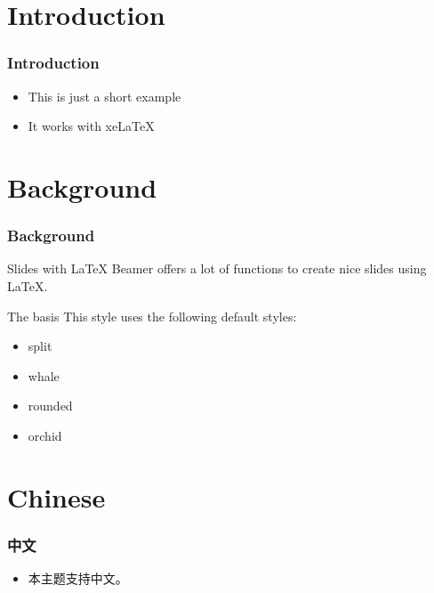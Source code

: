 \frame[plain]{\titlepage}

\section{Introduction}

\begin{frame}
  \frametitle{Introduction}
  
  \begin{itemize}
  \item<1-> This is just a short example
  \item<2-> It works with xeLaTeX
  \end{itemize}
\end{frame}

\section{Background}

\begin{frame}
  \frametitle{Background}

  \begin{block}{Slides with \LaTeX}
    Beamer offers a lot of functions to create nice slides using \LaTeX.
  \end{block}

  \begin{block}{The basis}
    This style uses the following default styles:
    \begin{itemize}
    \item split
    \item whale
    \item rounded
    \item orchid
    \end{itemize}
  \end{block}
\end{frame}

\section{Chinese}

\begin{frame}
  \frametitle{中文}

  \begin{itemize}
  \item 本主题支持中文。
  \end{itemize}
\end{frame}

